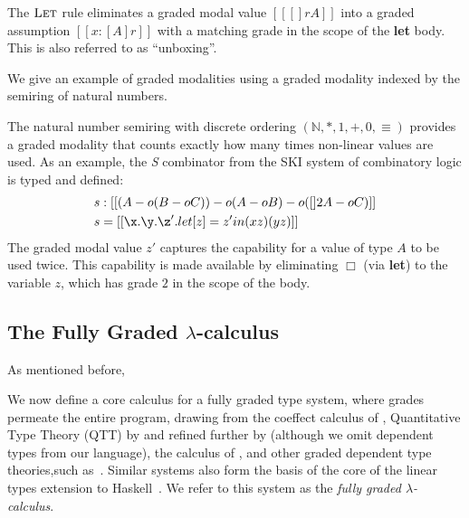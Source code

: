 The $\textsc{Let}$ rule eliminates a graded modal value $[[ [] r A ]]$
into a graded assumption $[[ x : [ A ] r ]]$ with a matching
grade in the scope of the \textbf{let} body. This is also referred to as
``unboxing''.

We give an example of graded modalities using a graded modality indexed
by the semiring of natural numbers.

\begin{example}
\label{ex:s-comb}
  The natural number semiring with discrete ordering $(\mathbb{N}, \ast, 1, +,
  0, \equiv)$ provides a graded modality that counts exactly how many times
  non-linear values are used. As an example, the \emph{S} combinator from
  the SKI system of combinatory logic is typed and defined:
\begin{align*}
s & : [[ (A -o (B -o C)) -o {(A -o B) -o ({[] 2 A} -o C)} ]] \\
s & = [[ \x . {\y . {\z' . {let [ z ] = z' in {(x z) (y z)}}}} ]]
\end{align*}
The graded modal value $z'$ captures the capability for a value
of type $A$ to be used twice. This capability is made available by eliminating
$\Box$ (via \textbf{let}) to the variable $z$, which has
grade $2$ in the scope of the body. 
\end{example}

\subsection{The Fully Graded $\lambda$-calculus}
\label{sec:graded-base}
As mentioned before, 

We now define a core calculus for a fully graded type system, where grades
permeate the entire program, drawing from the coeffect calculus of
\citet{petricek2014coeffects}, Quantitative Type Theory (QTT) by
\citet{McBride2016} and refined further by \citet{quantitative-type-theory}
(although we omit dependent types from our language), the calculus of
\citet{DBLP:journals/pacmpl/AbelB20}, and other graded dependent type
theories,such as~\citet{DBLP:conf/esop/MoonEO21}. Similar
systems also form the basis of the core of the linear types extension to
Haskell~\citep{DBLP:journals/pacmpl/BernardyBNJS18}. We
refer to this system as the \textit{fully graded $\lambda$-calculus}.

